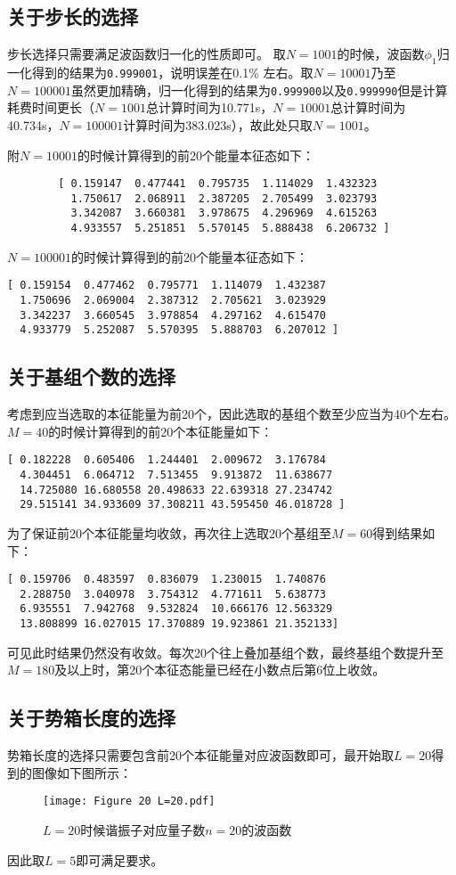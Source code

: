 \documentclass[12pt, openany]{article}
\begin{document}
	\subsection{关于步长的选择}
	步长选择只需要满足波函数归一化的性质即可。
	取$N=1001$的时候，波函数$\phi_1$归一化得到的结果为\verb|0.999001|，说明误差在0.1\% 左右。取$N=10001$乃至$N=100001$虽然更加精确，归一化得到的结果为\verb|0.999900|以及\verb|0.999990|但是计算耗费时间更长（$N=1001$总计算时间为10.771s，$N=10001$总计算时间为40.734s，$N=100001$计算时间为383.023s），故此处只取$N=1001$。

	附$N=10001$的时候计算得到的前20个能量本征态如下：
	\begin{lstlisting}
		[ 0.159147  0.477441  0.795735  1.114029  1.432323
		  1.750617  2.068911  2.387205  2.705499  3.023793
		  3.342087  3.660381  3.978675  4.296969  4.615263
		  4.933557  5.251851  5.570145  5.888438  6.206732 ]
	\end{lstlisting}
	$N=100001$的时候计算得到的前20个能量本征态如下：
	\begin{lstlisting}
[ 0.159154  0.477462  0.795771  1.114079  1.432387
  1.750696  2.069004  2.387312  2.705621  3.023929
  3.342237  3.660545  3.978854  4.297162  4.615470
  4.933779  5.252087  5.570395  5.888703  6.207012 ]
	\end{lstlisting}
	\subsection{关于基组个数的选择}
	考虑到应当选取的本征能量为前20个，因此选取的基组个数至少应当为40个左右。$M = 40$的时候计算得到的前20个本征能量如下：
	\begin{lstlisting}
[ 0.182228  0.605406  1.244401  2.009672  3.176784
  4.304451  6.064712  7.513455  9.913872  11.638677
  14.725080 16.680558 20.498633 22.639318 27.234742 
  29.515141 34.933609 37.308211 43.595450 46.018728 ]
	\end{lstlisting}
	为了保证前20个本征能量均收敛，再次往上选取20个基组至$M = 60$得到结果如下： 
	\begin{lstlisting}
[ 0.159706  0.483597  0.836079  1.230015  1.740876
  2.288750  3.040978  3.754312  4.771611  5.638773
  6.935551  7.942768  9.532824  10.666176 12.563329
  13.808899 16.027015 17.370889 19.923861 21.352133]
	\end{lstlisting}

	可见此时结果仍然没有收敛。每次20个往上叠加基组个数，最终基组个数提升至$M = 180$及以上时，第20个本征态能量已经在小数点后第6位上收敛。
	\subsection{关于势箱长度的选择}
	势箱长度的选择只需要包含前20个本征能量对应波函数即可，最开始取$L=20$得到的图像如下图所示：
	\begin{figure}[h]
		\centering
		\texttt{[image: Figure 20 L=20.pdf]}
		\caption{$L=20$时候谐振子对应量子数$n=20$的波函数}
	\end{figure}
	因此取$L = 5$即可满足要求。
\end{document}

